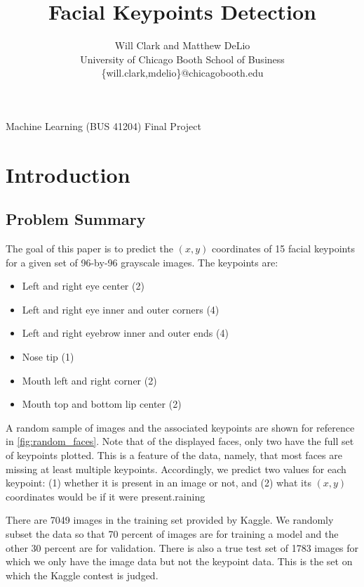 \documentclass[journal]{IEEEtran}
\begin{document}
\title{Facial Keypoints Detection}
\author{Will Clark and Matthew DeLio\\
University of Chicago Booth School of Business\\
\textsf{\{will.clark,mdelio\}@chicagobooth.edu}}

{Machine Learning (BUS 41204) Final Project}

\maketitle

\section{Introduction}\label{intro}

\subsection{Problem Summary}

The goal of this paper is to predict the $(x,y)$ coordinates of 15 facial keypoints for a given set of 96-by-96 grayscale images. The keypoints are:
\begin{itemize}
\item Left and right eye center (2)
\item Left and right eye inner and outer corners (4)
\item Left and right eyebrow inner and outer ends (4)
\item Nose tip (1)
\item Mouth left and right corner (2)
\item Mouth top and bottom lip center (2)
\end{itemize}
A random sample of images and the associated keypoints are shown for reference in \cref{fig:random_faces}. Note that of the displayed faces, only two have the full set of keypoints plotted. This is a feature of the data, namely, that most faces are missing at least multiple keypoints. Accordingly, we predict two values for each keypoint: (1) whether it is present in an image or not, and (2) what its $(x,y)$ coordinates would be if it were present.raining

There are 7049 images in the training set provided by Kaggle. We randomly subset the data so that 70 percent of images are for training a model and the other 30 percent are for validation. There is also a true test set of 1783 images for which we only have the image data but not the keypoint data. This is the set on which the Kaggle contest is judged.
\end{document}
